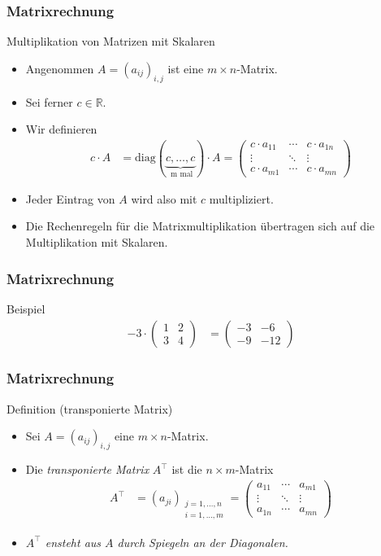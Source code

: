 \documentclass{beamer}
\renewcommand{\emph}[1]{{\textcolor{solarizedRed}{\itshape #1}}}
\newcommand\RR{\mathbb R}
\newcommand{\diag}{\mathrm{diag}}
\newcommand{\trans}{\top}
\newcommand{\ue}{\"u}
\newcommand{\mytitle}{Matrixrechnung}
\begin{document}
\begin{frame}\frametitle{\mytitle}
	\begin{block}{Multiplikation von Matrizen mit Skalaren}
		\begin{itemize}
			\item Angenommen $A=(a_{ij})_{i,j}$ ist eine $m\times n$-Matrix.
			\item Sei ferner $c\in\RR$.
			\item Wir definieren
				\begin{align*}
					c\cdot A&=\diag(\underbrace{c,\ldots,c}_{\mbox{ m mal}})\cdot A=\begin{pmatrix}
							   c\cdot a_{11}&\cdots&c\cdot a_{1n}\\\vdots&\ddots&\vdots\\c\cdot a_{m1}&\cdots&c\cdot a_{mn}
						   \end{pmatrix}
				\end{align*}
			\item Jeder Eintrag von $A$ wird also mit $c$ multipliziert.
			\item Die Rechenregeln f\ue r die Matrixmultiplikation \ue bertragen sich auf die Multiplikation mit Skalaren.
		\end{itemize}
	\end{block}
\end{frame}

\begin{frame}\frametitle{\mytitle}
	\begin{block}{Beispiel}
		\begin{align*}
			-3\cdot\begin{pmatrix}1&2\\3&4\end{pmatrix}&=\begin{pmatrix}-3&-6\\-9&-12\end{pmatrix}
		\end{align*}
	\end{block}
\end{frame}

\begin{frame}\frametitle{\mytitle}
	\begin{block}{Definition (transponierte Matrix)}
		\begin{itemize}
			\item Sei $A=(a_{ij})_{i,j}$ eine $m\times n$-Matrix.
			\item Die \emph{transponierte Matrix} $A^\trans$ ist die $n\times m$-Matrix
				\begin{align*}
					A^\trans&=(a_{ji})_{\substack{j=1,\ldots,n\\i=1,\ldots,m}}
					=\begin{pmatrix}
						a_{11}&\cdots&a_{m1}\\\vdots&\ddots&\vdots\\a_{1n}&\cdots&a_{mn}
					\end{pmatrix}
				\end{align*}
			\item \emph{$A^\trans$ ensteht aus $A$ durch Spiegeln an der Diagonalen.}
		\end{itemize}
	\end{block}
\end{frame}
\end{document}
